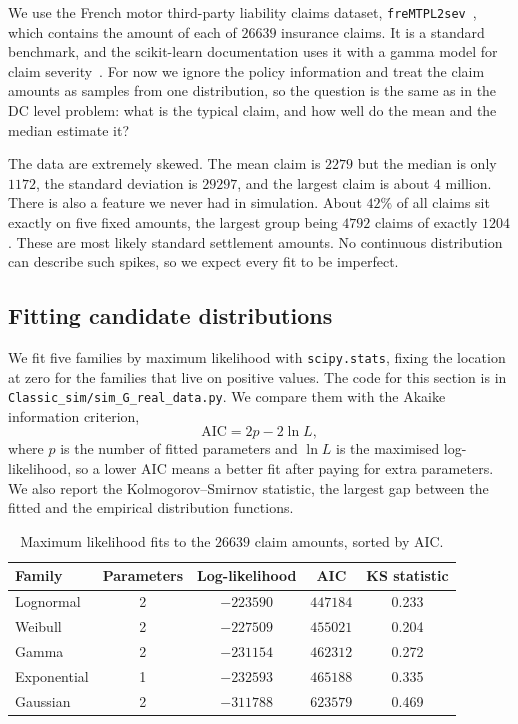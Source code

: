 \documentclass[11pt]{article}
\numberwithin{figure}{section}
\numberwithin{equation}{section}
\begin{document}
We use the French motor third-party liability claims dataset, \texttt{freMTPL2sev}~\cite{casdatasets},
which contains the amount of each of $26639$ insurance claims. It is a standard benchmark, and the
scikit-learn documentation uses it with a gamma model for claim severity~\cite{sklearntweedie}. For
now we ignore the policy information and treat the claim amounts as samples from one distribution,
so the question is the same as in the DC level problem: what is the typical claim, and how well do
the mean and the median estimate it?

The data are extremely skewed. The mean claim is $2279$ but the median is only $1172$, the standard
deviation is $29297$, and the largest claim is about $4$ million. There is also a feature we never
had in simulation. About $42\%$ of all claims sit exactly on five fixed amounts, the largest group
being $4792$ claims of exactly $1204$. These are most likely standard settlement amounts. No
continuous distribution can describe such spikes, so we expect every fit to be imperfect.

\subsection{Fitting candidate distributions}

We fit five families by maximum likelihood with \texttt{scipy.stats}, fixing the location at
zero for the families that live on positive values. The code for this section is in
\texttt{Classic\_sim/sim\_G\_real\_data.py}.
We compare them with the Akaike information criterion,
\[
  \text{AIC} = 2p - 2\ln L ,
\]
where $p$ is the number of fitted parameters and $\ln L$ is the maximised log-likelihood, so a lower
AIC means a better fit after paying for extra parameters. We also report the Kolmogorov--Smirnov
statistic, the largest gap between the fitted and the empirical distribution functions.

\begin{table}[H]
\centering
\begin{tabular}{lcccc}
\toprule
Family & Parameters & Log-likelihood & AIC & KS statistic \\
\midrule
Lognormal   & 2 & $-223590$ & $447184$ & 0.233 \\
Weibull     & 2 & $-227509$ & $455021$ & 0.204 \\
Gamma       & 2 & $-231154$ & $462312$ & 0.272 \\
Exponential & 1 & $-232593$ & $465188$ & 0.335 \\
Gaussian    & 2 & $-311788$ & $623579$ & 0.469 \\
\bottomrule
\end{tabular}
\caption{Maximum likelihood fits to the $26639$ claim amounts, sorted by AIC.}
\label{tab:real-fits}
\end{table}
\end{document}
